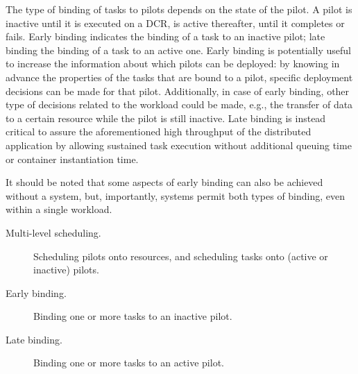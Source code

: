\documentclass{sig-alternate}
\begin{document}
The type of binding of tasks to pilots depends on the state of the pilot. A
pilot is inactive until it is executed on a DCR, is active thereafter, until it
completes or fails. Early binding indicates the binding of a task to an inactive
pilot; late binding the binding of a task to an active one. Early binding is
potentially useful to increase the information about which pilots can be
deployed: by knowing in advance the properties of the tasks that are bound to a
pilot, specific deployment decisions can be made for that pilot. Additionally,
in case of early binding, other type of decisions related to the workload could
be made, e.g., the transfer of data to a certain resource while the pilot is
still inactive. Late binding is instead critical to assure the aforementioned
high throughput of the distributed application by allowing sustained task
execution without additional queuing time or container instantiation time.

It should be noted that some aspects of early binding can also be achieved
without a \pilot system, but, importantly, \pilot systems permit both types of
binding, even within a single workload.



\begin{description}

\item[Multi-level scheduling.] Scheduling pilots onto resources, and scheduling
tasks onto (active or inactive) pilots.

\item[Early binding.] Binding one or more tasks to an inactive pilot.

\item[Late binding.] Binding one or more tasks to an active pilot.

\end{description}


\end{document}
